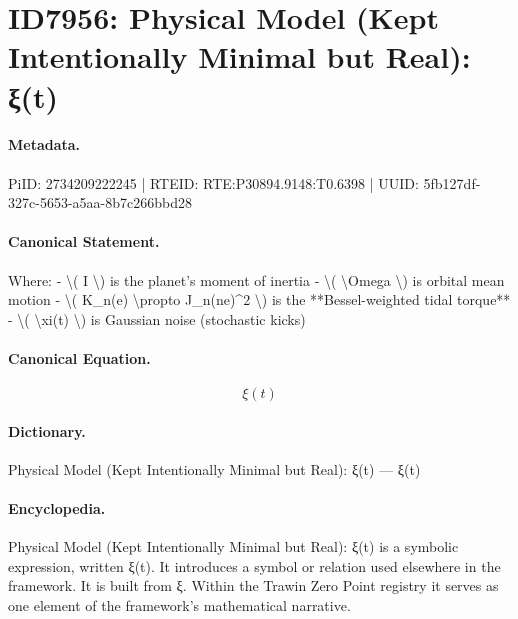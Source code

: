 \section*{ID7956: Physical Model (Kept Intentionally Minimal but Real): ξ(t)}
\paragraph{Metadata.}
PiID: 2734209222245 | RTEID: RTE:P30894.9148:T0.6398 | UUID: 5fb127df-327c-5653-a5aa-8b7c266bbd28

\paragraph{Canonical Statement.}
Where: - \textbackslash{}( I \textbackslash{}) is the planet’s moment of inertia - \textbackslash{}( \textbackslash{}Omega \textbackslash{}) is orbital mean motion - \textbackslash{}( K\_n(e) \textbackslash{}propto J\_n(ne)\textasciicircum{}2 \textbackslash{}) is the **Bessel-weighted tidal torque** - \textbackslash{}( \textbackslash{}xi(t) \textbackslash{}) is Gaussian noise (stochastic kicks)

\paragraph{Canonical Equation.}
\[
\xi(t)
\]

\paragraph{Dictionary.}
Physical Model (Kept Intentionally Minimal but Real): ξ(t) — ξ(t)

\paragraph{Encyclopedia.}
Physical Model (Kept Intentionally Minimal but Real): ξ(t) is a symbolic expression, written ξ(t). It introduces a symbol or relation used elsewhere in the framework. It is built from ξ. Within the Trawin Zero Point registry it serves as one element of the framework's mathematical narrative.
